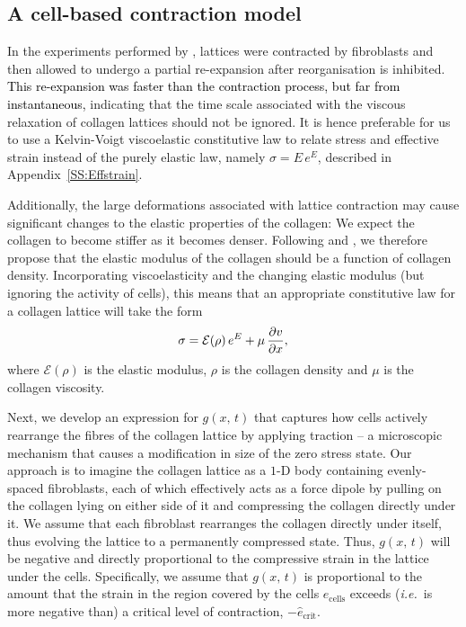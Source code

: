 
\subsection{A cell-based contraction model}
\label{SS:cellcontract}

In the experiments performed by \citet{Guidry1985}, lattices were contracted by fibroblasts and then allowed to undergo a partial re-expansion after reorganisation is inhibited. \textcolor{black}{This re-expansion was faster than the contraction process, but far from instantaneous,} indicating that the time scale associated with the viscous relaxation of collagen lattices should not be ignored. It is hence preferable for us to use a Kelvin-Voigt viscoelastic constitutive law to relate stress and effective strain instead of the purely elastic law, namely $\sigma = E \, e^E$, described in Appendix~\ref{SS:Effstrain}.

Additionally, the large deformations associated with lattice contraction may cause significant changes to the elastic properties of the collagen: We expect the collagen to become stiffer as it becomes denser. Following \citet{Ramtani2002} and \citet{Ramtani2004}, we therefore propose that the elastic modulus of the collagen should be a function of collagen density. Incorporating viscoelasticity and the changing elastic modulus (but ignoring the activity of cells), this means that an appropriate constitutive law for a collagen lattice will take the form
\begin{equation}
 \sigma = \mathcal{E}(\rho) \, e^E + \mu \, \frac{\partial v}{\partial x}, \label{viscoelasticconst}
\end{equation}
where $\mathcal{E}(\rho)$ is the elastic modulus, $\rho$ is the collagen density and $\mu$ is the collagen viscosity.

Next, we develop an expression for $g(x,\,t)$ that captures how cells actively rearrange the fibres of the collagen lattice by applying traction -- a microscopic mechanism that causes a modification in size of the zero stress state. Our approach is to imagine the collagen lattice as a $1$-D body containing evenly-spaced fibroblasts, each of which effectively acts as a force dipole by pulling on the collagen lying on either side of it and compressing the collagen directly under it. We assume that each fibroblast rearranges the collagen directly under itself, thus evolving the lattice to a permanently compressed state. Thus, $g(x,\,t)$ will be negative and directly proportional to the compressive strain in the lattice under the cells. Specifically, we assume that $g(x,\,t)$ is proportional to the amount that the strain in the region covered by the cells $e_\text{cells}$ exceeds (\emph{i.e.}~is more negative than) a critical level of contraction, $-\hat{e}_\text{crit}$.

